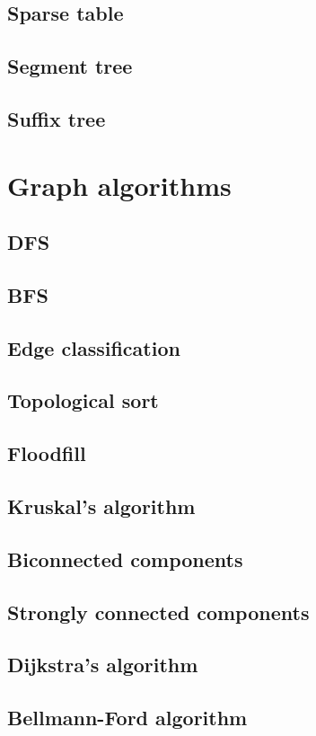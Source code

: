 \documentclass[a4paper]{article}
\begin{document}
	\subsection{Sparse table}
	\subsection{Segment tree}
	\subsection{Suffix tree}
	\section{Graph algorithms}
	\subsection{DFS}
	\subsection{BFS}
	\subsection{Edge classification}
	\subsection{Topological sort}
	\subsection{Floodfill}
	\subsection{Kruskal's algorithm}
	\subsection{Biconnected components}
	\subsection{Strongly connected components}
	\subsection{Dijkstra's algorithm}
	\subsection{Bellmann-Ford algorithm}
\end{document}

